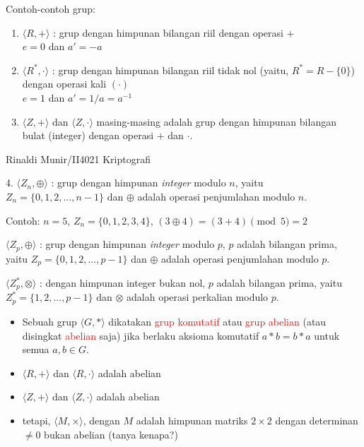 \documentclass{article}
\begin{document}
Contoh-contoh grup:

\begin{enumerate}
  \item $\langle R, + \rangle$ : grup dengan himpunan bilangan riil dengan operasi $+$ \\
  $e = 0$ dan $a' = -a$
  
  \item $\langle R^*, \cdot \rangle$ : grup dengan himpunan bilangan riil tidak nol (yaitu, $R^* = R - \{ 0 \}$) dengan operasi kali $(\cdot)$ \\
  $e = 1$ dan $a' = 1/a = a^{-1}$
  
  \item $\langle Z, + \rangle$ dan $\langle Z, \cdot \rangle$ masing-masing adalah grup dengan himpunan bilangan bulat (integer) dengan operasi $+$ dan $\cdot$.
\end{enumerate}

\vfill
\begin{center}
  Rinaldi Munir/II4021 Kriptografi
\end{center}

\newpage


4. $\langle Z_n, \oplus \rangle$ : grup dengan himpunan \textit{integer} modulo $n$, yaitu $Z_n = \{0, 1, 2, ..., n - 1\}$ dan $\oplus$ adalah operasi penjumlahan modulo $n$.

Contoh: $n = 5$, $Z_n = \{0, 1, 2, 3, 4\}$, $(3 \oplus 4) = (3 + 4) \pmod 5 = 2$

$\langle Z_p, \oplus \rangle$ : grup dengan himpunan \textit{integer} modulo $p$, $p$ adalah bilangan prima, yaitu $Z_p = \{0, 1, 2, ..., p - 1\}$ dan $\oplus$ adalah operasi penjumlahan modulo $p$.

$\langle Z_p^*, \otimes \rangle$ : dengan himpunan integer bukan nol, $p$ adalah bilangan prima, yaitu $Z_p^* = \{1, 2, ..., p - 1\}$ dan $\otimes$ adalah operasi perkalian modulo $p$.

\newpage


\begin{itemize}
    \item Sebuah grup $\langle G, *\rangle$ dikatakan \textcolor{red}{grup komutatif} atau \textcolor{red}{grup abelian} (atau disingkat \textcolor{red}{abelian} saja) jika berlaku aksioma komutatif $a * b = b * a$ untuk semua $a, b \in G$.
    \item $\langle R, +\rangle$ dan $\langle R, \cdot\rangle$ adalah abelian
    \item $\langle Z, +\rangle$ dan $\langle Z, \cdot\rangle$ adalah abelian
    \item tetapi, $\langle M, \times\rangle$, dengan $M$ adalah himpunan matriks $2 \times 2$ dengan determinan $\neq 0$ bukan abelian (tanya kenapa?)
\end{itemize}
\end{document}
